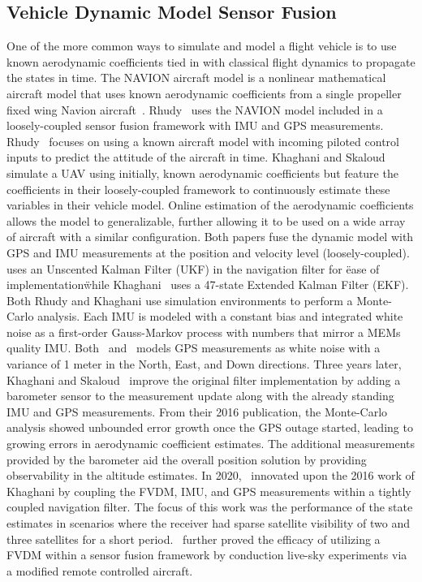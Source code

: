 \subsection{\textbf{Vehicle Dynamic Model Sensor Fusion}}
One of the more common ways to simulate and model a flight vehicle is to use known aerodynamic coefficients tied in with classical flight dynamics to propagate the states in time. The NAVION aircraft model is a nonlinear mathematical aircraft model that uses known aerodynamic coefficients from a single propeller fixed wing Navion aircraft~\cite{nelsonFlightStabilityAutomatic1998}. Rhudy~\cite{rhudyDynamicModelaidedSensor2017} uses the NAVION model included in a loosely-coupled sensor fusion framework with IMU and GPS measurements. Rhudy~\cite{rhudyDynamicModelaidedSensor2017} focuses on using a known aircraft model with incoming piloted control inputs to predict the attitude of the aircraft in time. Khaghani and Skaloud~\cite{khaghaniAutonomousVehicleDynamic2016} simulate a UAV using initially, known aerodynamic coefficients but feature the coefficients in their loosely-coupled framework to continuously estimate these variables in their vehicle model. Online estimation of the aerodynamic coefficients allows the model to generalizable, further allowing it to be used on a wide array of aircraft with a similar configuration. Both papers fuse the dynamic model with GPS and IMU measurements at the position and velocity level (loosely-coupled).~\cite{rhudyDynamicModelaidedSensor2017} uses an Unscented Kalman Filter (UKF) in the navigation filter for \"ease of implementation\" while Khaghani~\cite{khaghaniAutonomousVehicleDynamic2016,khaghaniAssessmentVDMbasedAutonomous2018} uses a 47-state Extended Kalman Filter (EKF). Both Rhudy and Khaghani use simulation environments to perform a Monte-Carlo analysis. Each IMU is modeled with a constant bias and integrated white noise as a first-order Gauss-Markov process with numbers that mirror a MEMs quality IMU\@. Both~\cite{khaghaniAutonomousVehicleDynamic2016} and~\cite{rhudyDynamicModelaidedSensor2017} models GPS measurements as white noise with a variance of 1 meter in the North, East, and Down directions. Three years later, Khaghani and Skaloud~\cite{khaghaniAssessmentVDMbasedAutonomous2018} improve the original filter implementation by adding a barometer sensor to the measurement update along with the already standing IMU and GPS measurements. From their 2016 publication, the Monte-Carlo analysis showed unbounded error growth once the GPS outage started, leading to growing errors in aerodynamic coefficient estimates. The additional measurements provided by the barometer aid the overall position solution by providing observability in the altitude estimates. In 2020,~\cite{mwenegohaModelbasedTightlyCoupled2020} innovated upon the 2016 work of Khaghani by coupling the FVDM, IMU, and GPS measurements within a tightly coupled navigation filter. The focus of this work was the performance of the state estimates in scenarios where the receiver had sparse satellite visibility of two and three satellites for a short period.~\cite{mwenegohaModelbasedTightlyCoupled2020} further proved the efficacy of utilizing a FVDM within a sensor fusion framework by conduction live-sky experiments via a modified remote controlled aircraft.

